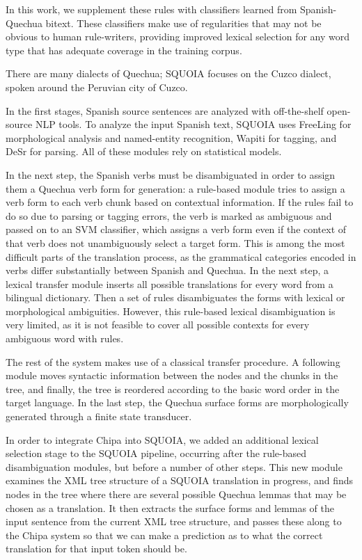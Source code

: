 In this work, we supplement these rules with classifiers learned from
Spanish-Quechua bitext.  These classifiers make use of regularities that may not
be obvious to human rule-writers, providing improved lexical selection for
any word type that has adequate coverage in the training corpus.

There are many dialects of Quechua; SQUOIA focuses on the
Cuzco dialect, spoken around the Peruvian city of Cuzco.

In the first stages, Spanish source sentences are analyzed with off-the-shelf
open-source NLP tools. To analyze the input Spanish text,
SQUOIA uses FreeLing \cite{padro12} for morphological analysis and named-entity
recognition,
Wapiti \cite{lavergne2010practical} for tagging,
and DeSr \cite{attardi-EtAl:2007:EMNLP-CoNLL2007} for parsing.
All of these modules rely on statistical models.

In the next step, the Spanish verbs must be disambiguated in order to assign
them a Quechua verb form for generation: a rule-based module tries to assign a
verb form to each verb chunk based on contextual information. If the rules fail to
do so due to parsing or tagging errors, the verb is marked as ambiguous and
passed on to an SVM classifier, which assigns a verb form even if the context
of that verb does not unambiguously select a target form. This is among the
most difficult parts of the
translation process, as the grammatical categories encoded in verbs differ
substantially between Spanish and Quechua. In the next step, a lexical transfer
module inserts all possible translations for every word from a bilingual dictionary.
Then a set of rules disambiguates the forms with lexical or morphological
ambiguities. However, this rule-based lexical disambiguation is very limited,
as it is not feasible to cover all possible contexts for every ambiguous word
with rules.

The rest of the system makes use of a classical transfer procedure. A following module
moves syntactic information between the nodes and the chunks in the tree, and
finally, the tree is reordered according to the basic word order in the target
language. In the last step, the Quechua surface forms are morphologically
generated through a finite state transducer.

In order to integrate Chipa into SQUOIA, we added an additional lexical
selection stage to the SQUOIA pipeline, occurring after the rule-based
disambiguation modules, but before a number of other steps. This new module
examines the XML tree structure of a SQUOIA translation in progress, and finds
nodes in the tree where there are several possible Quechua lemmas that may be
chosen as a translation. It then extracts the surface forms and lemmas of the
input sentence from the current XML tree structure, and passes these along to
the Chipa system so that we can make a prediction as to what the correct
translation for that input token should be.

